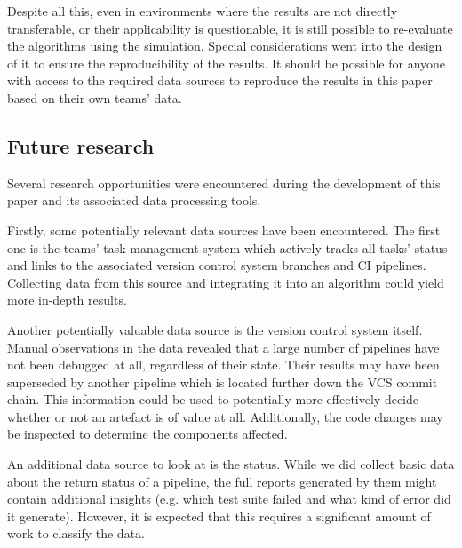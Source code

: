         Despite all this, even in environments where the results are not directly transferable, or their applicability is questionable, it is still possible to re-evaluate the algorithms using the simulation. Special considerations went into the design of it to ensure the reproducibility of the results. It should be possible for anyone with access to the required data sources to reproduce the results in this paper based on their own teams' data.
    
    \subsection{Future research}
        Several research opportunities were encountered during the development of this paper and its associated data processing tools.
        
        Firstly, some potentially relevant data sources have been encountered. The first one is the teams' task management system which actively tracks all tasks' status and links to the associated version control system branches and CI pipelines. Collecting data from this source and integrating it into an algorithm could yield more in-depth results.
        
        Another potentially valuable data source is the version control system itself. Manual observations in the data revealed that a large number of pipelines have not been debugged at all, regardless of their state. Their results may have been superseded by another pipeline which is located further down the VCS commit chain. This information could be used to potentially more effectively decide whether or not an artefact is of value at all. Additionally, the code changes may be inspected to determine the components affected.
        
        An additional data source to look at is the status. While we did collect basic data about the return status of a pipeline, the full reports generated by them might contain additional insights (e.g. which test suite failed and what kind of error did it generate). However, it is expected that this requires a significant amount of work to classify the data.
        

